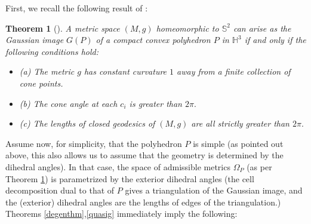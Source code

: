 \documentclass[12pt]{amsart}
\newtheorem{theorem}{Theorem}
\theoremstyle{remark}
\begin{document}
First, we recall the following result of \cite{thes,thes0}:
\begin{theorem}[\cite{thes,thes0}]
\label{annelk}
A metric space $(M, g)$ homeomorphic to $\mathbb{S}^2$ can arise as the Gaussian image $G(P)$ of a compact convex polyhedron $P$ in $\mathbb{H}^3$ if and only if the following conditions hold:
\begin{itemize}
\item{(a)} The metric $g$ has constant curvature $1$ away from a finite collection of cone points.
\item{(b)} The cone angle at each $c_i$ is greater than $2\pi.$
\item{(c)} The lengths of closed geodesics of $(M, g)$ are all strictly greater than $2\pi.$
\end{itemize}
\end{theorem}
Assume now, for simplicity, that the polyhedron $P$ is simple (as pointed out above, this also allows us to assume that the geometry is determined by the dihedral angles). In that case, the space of admissible metrics $\Omega_P$ (as per Theorem \ref{annelk}) is parametrized by the exterior dihedral angles (the cell decomposition dual to that of $P$ gives a triangulation of the Gaussian image, and the (exterior) dihedral angles are the lengths of edges of the triangulation.) Theorems \ref{degenthm},\ref{quasig} immediately imply the following:
\end{document}
